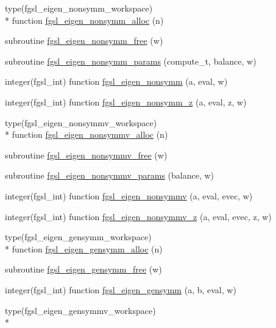 \begin{DoxyCompactItemize}
\item 
type(fgsl\-\_\-eigen\-\_\-nonsymm\-\_\-workspace) \\*
function \hyperlink{eigen_8finc_a67e1213526c2a57e599ea68c4ccb7f17}{fgsl\-\_\-eigen\-\_\-nonsymm\-\_\-alloc} (n)
\item 
subroutine \hyperlink{eigen_8finc_a4c13d8c917420938df8375af8909183f}{fgsl\-\_\-eigen\-\_\-nonsymm\-\_\-free} (w)
\item 
subroutine \hyperlink{eigen_8finc_aa9c147deaa41d2f07a8af9dde8abf35f}{fgsl\-\_\-eigen\-\_\-nonsymm\-\_\-params} (compute\-\_\-t, balance, w)
\item 
integer(fgsl\-\_\-int) function \hyperlink{eigen_8finc_a5044ee7ae8200fc994b55c7cd4f047d7}{fgsl\-\_\-eigen\-\_\-nonsymm} (a, eval, w)
\item 
integer(fgsl\-\_\-int) function \hyperlink{eigen_8finc_ae3e1cd3e7d0f3abd38f98a5f911d6889}{fgsl\-\_\-eigen\-\_\-nonsymm\-\_\-z} (a, eval, z, w)
\item 
type(fgsl\-\_\-eigen\-\_\-nonsymmv\-\_\-workspace) \\*
function \hyperlink{eigen_8finc_af6b786903112c4f4139bee94120feea4}{fgsl\-\_\-eigen\-\_\-nonsymmv\-\_\-alloc} (n)
\item 
subroutine \hyperlink{eigen_8finc_a4684734bff6c27f739aeb31d3b090bee}{fgsl\-\_\-eigen\-\_\-nonsymmv\-\_\-free} (w)
\item 
subroutine \hyperlink{eigen_8finc_ae6a1d284903b7387319d8636df94a679}{fgsl\-\_\-eigen\-\_\-nonsymmv\-\_\-params} (balance, w)
\item 
integer(fgsl\-\_\-int) function \hyperlink{eigen_8finc_aa09384a54b214602b298c94bc07d3c58}{fgsl\-\_\-eigen\-\_\-nonsymmv} (a, eval, evec, w)
\item 
integer(fgsl\-\_\-int) function \hyperlink{eigen_8finc_ad466997b5f8528265070f2aba003ddab}{fgsl\-\_\-eigen\-\_\-nonsymmv\-\_\-z} (a, eval, evec, z, w)
\item 
type(fgsl\-\_\-eigen\-\_\-gensymm\-\_\-workspace) \\*
function \hyperlink{eigen_8finc_a087cf013d99c79e7f2670c0e6035260b}{fgsl\-\_\-eigen\-\_\-gensymm\-\_\-alloc} (n)
\item 
subroutine \hyperlink{eigen_8finc_a6896d5bb5a13213ea85bb1c89bd77109}{fgsl\-\_\-eigen\-\_\-gensymm\-\_\-free} (w)
\item 
integer(fgsl\-\_\-int) function \hyperlink{eigen_8finc_ab6358ebdfcf35887b7fdabc3588d4818}{fgsl\-\_\-eigen\-\_\-gensymm} (a, b, eval, w)
\item 
type(fgsl\-\_\-eigen\-\_\-gensymmv\-\_\-workspace) \\*

\end{DoxyCompactItemize}
